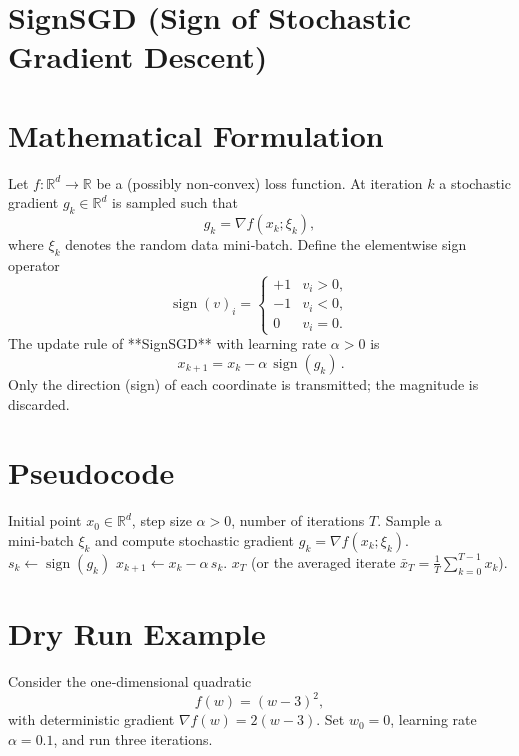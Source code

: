 \documentclass{article}
\newcommand{\R}{\mathbb{R}}
\begin{document}
\section*{SignSGD (Sign of Stochastic Gradient Descent)}

\section*{Mathematical Formulation}
Let $f:\R^{d}\to\R$ be a (possibly non‑convex) loss function.  
At iteration $k$ a stochastic gradient $g_k\in\R^{d}$ is sampled such that
\[
g_k = \nabla f(x_k;\xi_k),
\]
where $\xi_k$ denotes the random data mini‑batch.  
Define the elementwise sign operator
\[
\operatorname{sign}(v)_i = 
\begin{cases}
+1 & v_i>0,\\
-1 & v_i<0,\\
0  & v_i=0 .
\end{cases}
\]
The update rule of **SignSGD** with learning rate $\alpha>0$ is
\begin{equation}
\boxed{\,x_{k+1}=x_k-\alpha\,\operatorname{sign}(g_k)\,}. \tag{1}
\end{equation}
Only the direction (sign) of each coordinate is transmitted; the magnitude is discarded.

\section*{Pseudocode}
\begin{algorithm}[H]
\caption{SignSGD}
\begin{algorithmic}[1]
\REQUIRE Initial point $x_0\in\R^{d}$, step size $\alpha>0$, number of iterations $T$.
    \STATE Sample a mini‑batch $\xi_k$ and compute stochastic gradient $g_k=\nabla f(x_k;\xi_k)$.
    \STATE $s_k \gets \operatorname{sign}(g_k)$ 
    \STATE $x_{k+1} \gets x_k - \alpha\, s_k$.
\ENDFOR
\RETURN $x_T$ (or the averaged iterate $\bar x_T=\frac1T\sum_{k=0}^{T-1}x_k$).
\end{algorithmic}
\end{algorithm}

\section*{Dry Run Example}
Consider the one‑dimensional quadratic
\[
f(w)=(w-3)^2,
\]
with deterministic gradient $\nabla f(w)=2(w-3)$.  
Set $w_0=0$, learning rate $\alpha=0.1$, and run three iterations.
\end{document}
